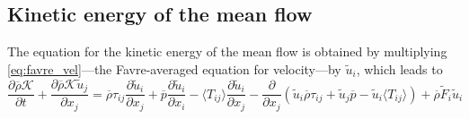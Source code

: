 \documentclass[oneside,a4paper,11pt]{report}
\newcommand{\rhoavg}{\overline{\rho}}
\newcommand{\pavg}{\overline{p}}
\newcommand{\rs}{\tau}          %
\newcommand{\uavgf}{\widetilde{u}}
\begin{document}
\subsection{Kinetic energy of the mean flow}
The equation for the kinetic energy of the mean flow is obtained by multiplying \cref{eq:favre_vel}---the Favre-averaged equation for velocity---by $\uavgf_i$, which leads to
\begin{equation}
\label{eq:ke_favreflow}
\frac{ \partial \rhoavg \mathcal{K} }{ \partial t} + \frac{ \partial \rhoavg \mathcal{K} \uavgf_j }{ \partial x_j} = \rhoavg \rs_{ij} \frac{ \partial \uavgf_i }{ \partial x_j } + \pavg \frac{ \partial \uavgf_i }{ \partial x_i } - \langle T_{ij} \rangle \frac{ \partial \uavgf_i }{ \partial x_j } - \frac{\partial}{\partial x_j} \left ( \uavgf_i \rhoavg \rs_{ij} + \uavgf_j \pavg - \uavgf_i \langle T_{ij} \rangle \right ) + \rhoavg \tilde{F}_i \uavgf_i
\end{equation}

\end{document}
